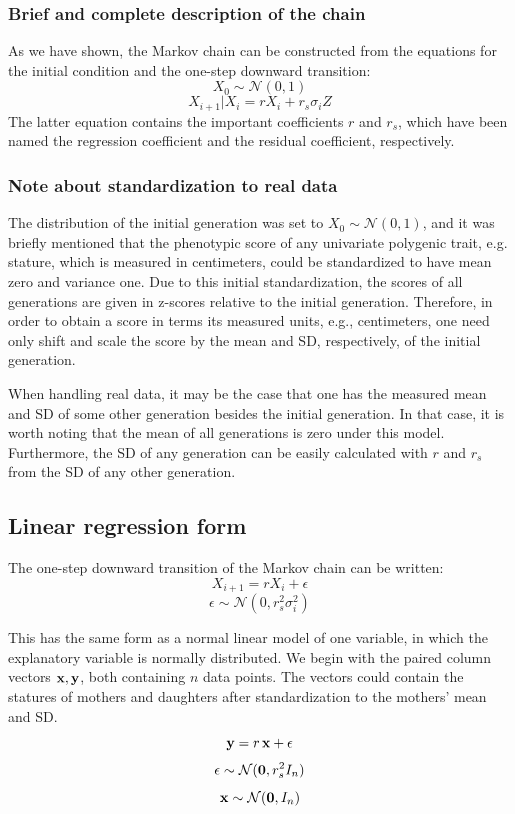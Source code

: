 \documentclass[letterpaper,10pt]{article} %
\begin{document}
\subsubsection*{Brief and complete description of the chain}
As we have shown, the Markov chain can be constructed from the equations for the initial condition and the one-step downward transition:
$$X_0 \sim \mathcal{N}(0, 1)$$
$$X_{i+1}|X_i = rX_i+ r_s\sigma_iZ$$
The latter equation contains the important coefficients $r$ and $r_s$, which have been named the regression coefficient and the residual coefficient, respectively. 

\subsubsection*{Note about standardization to real data}
The distribution of the initial generation was set to $X_0 \sim \mathcal{N}(0, 1)$, and it was briefly mentioned that the phenotypic score of any univariate polygenic trait, e.g. stature, which is measured in centimeters, could be standardized to have mean zero and variance one. Due to this initial standardization, the scores of all generations are given in z-scores relative to the initial generation. Therefore, in order to obtain a score in terms its measured units, e.g., centimeters, one need only shift and scale the score by the mean and SD, respectively, of the initial generation. 

When handling real data, it may be the case that one has the measured mean and SD of some other generation besides the initial generation. In that case, it is worth noting that the mean of all generations is zero under this model. Furthermore, the SD of any generation can be easily calculated with $r$ and $r_s$ from the SD of any other generation.



\subsection{Linear regression form}

The one-step downward transition of the Markov chain can be written:
$$X_{i+1} = rX_i + \epsilon$$
$$\epsilon \sim \mathcal{N}(0, r_s^2 \sigma_i^2)$$

This has the same form as a normal linear model of one variable, in which the explanatory variable is normally distributed. We begin with the paired column vectors $\bold{x}, \bold{y}$, both containing $n$ data points. The vectors could contain the statures of mothers and daughters after standardization to the mothers' mean and SD. 
$$\bold{y} = r \, \bold{x} + \bold{\epsilon}$$
$$\bold{\epsilon} \sim \mathcal{N}(\bold{0}, r_s^2 I_n)$$
$$\bold{x} \sim \mathcal{N}(\bold{0}, I_n)$$
\end{document}
